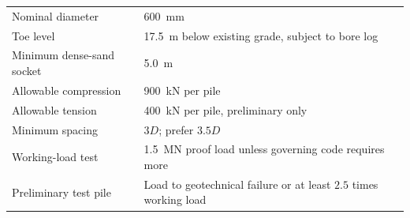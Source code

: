 \begin{keybox}
\begin{tabularx}{\linewidth}{@{}L{42mm}Y@{}}
Nominal diameter & \SI{600}{\milli\metre} \\
Toe level & \SI{17.5}{\metre} below existing grade, subject to bore log \\
Minimum dense-sand socket & \SI{5.0}{\metre} \\
Allowable compression & \SI{900}{\kilo\newton} per pile \\
Allowable tension & \SI{400}{\kilo\newton} per pile, preliminary only \\
Minimum spacing & $3D$; prefer $3.5D$ \\
Working-load test & \SI{1.5}{\mega\newton} proof load unless governing code requires more \\
Preliminary test pile & Load to geotechnical failure or at least $2.5$ times working load \\
\end{tabularx}
\end{keybox}

